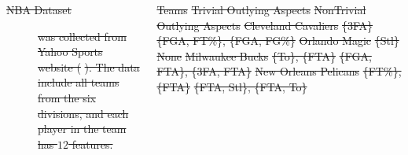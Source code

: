 \documentclass{tikzposter} %
\providecommand{\DIFdeltex}[1]{{\protect\color{red}\sout{#1}}}                      %
\providecommand{\DIFdelbegin}{} %
\providecommand{\DIFdelend}{} %
\providecommand{\DIFdel}[1]{\texorpdfstring{\DIFdeltex{#1}}{}} %
\newcommand{\DIFscaledelfig}{0.5}
\newlength{\DIFdelgraphicswidth} %
\newlength{\DIFdelgraphicsheight} %
\newcommand{\DIFdelincludegraphics}[2][]{%
\sbox{\DIFdelgraphicsbox}{\DIFOincludegraphics[#1]{#2}}%
\settoboxwidth{\DIFdelgraphicswidth}{\DIFdelgraphicsbox} %
\settoboxtotalheight{\DIFdelgraphicsheight}{\DIFdelgraphicsbox} %
\scalebox{\DIFscaledelfig}{%
\parbox[b]{\DIFdelgraphicswidth}{\usebox{\DIFdelgraphicsbox}\\[-\baselineskip] \rule{\DIFdelgraphicswidth}{0em}}\llap{\resizebox{\DIFdelgraphicswidth}{\DIFdelgraphicsheight}{%
\setlength{\unitlength}{\DIFdelgraphicswidth}%
\begin{picture}(1,1)%
\thicklines\linethickness{2pt} %
{\color[rgb]{1,0,0}\put(0,0){\framebox(1,1){}}}%
{\color[rgb]{1,0,0}\put(0,0){\line( 1,1){1}}}%
{\color[rgb]{1,0,0}\put(0,1){\line(1,-1){1}}}%
\end{picture}%
}\hspace*{3pt}}} %
} %
\DeclareRobustCommand{\DIFdelbegin}{\DIFOdelbegin \let\includegraphics\DIFdelincludegraphics} %
\DeclareRobustCommand{\DIFdelend}{\DIFOaddend \let\includegraphics\DIFOincludegraphics} %
\begin{document}
\begin{columns}
{%
\begin{description}%
\item[\DIFdel{NBA Dataset}]%
\DIFdel{was collected from Yahoo Sports
website (}%
\DIFdel{).
The data include all teams from the six divisions,
and each player in the team has $12$ features.
}
\end{description}%
\DIFdelend \vspace{.5cm}
\DIFdelbegin %
\DIFdel{Teams                   }%
\DIFdel{Trivial Outlying Aspects  }%
\DIFdel{NonTrivial Outlying Aspects    }%
\DIFdel{Cleveland Cavaliers     }%
\DIFdel{\{3FA\}                   }%
\DIFdel{\{FGA, FT\%\}, \{FGA, FG\%\} }%
\DIFdel{Orlando Magic           }%
\DIFdel{\{Stl\}                   }%
\DIFdel{None                         }%
\DIFdel{Milwaukee Bucks         }%
\DIFdel{\{To\}, \{FTA\}           }%
\DIFdel{\{FGA, FTA\}, \{3FA, FTA\}     }%
    \DIFdel{New Orleans Pelicans    }%
\DIFdel{\{FT\%\}, \{FTA\}         }%
\DIFdel{\{FTA, Stl\}, \{FTA, To\}          }%
\DIFdelend %
}
\end{columns}
\end{document}
